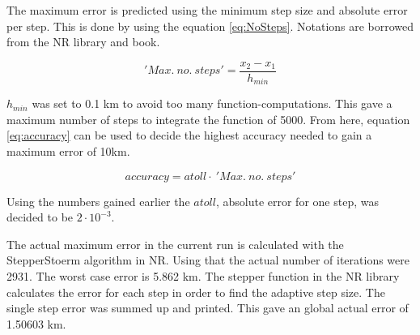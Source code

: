 The maximum error is predicted using the minimum step size and absolute error per step.
This is done by using the equation \ref{eq:NoSteps}.
Notations are borrowed from the NR library and book.

\begin{equation}
'Max.\ no.\ steps' = \frac{x_2 - x_1}{h_{min}}
\label{eq:NoSteps}
\end{equation}

\(h_{min}\) was set to 0.1 km to avoid too many function-computations.
This gave a maximum number of steps to integrate the function of 5000.
From here, equation \ref{eq:accuracy} can be used to decide the highest accuracy needed to gain a maximum error of 10km.

\begin{equation}
accuracy = atoll \cdot \ 'Max.\ no.\ steps'
\label{eq:accuracy}
\end{equation}

Using the numbers gained earlier the \(atoll\), absolute error for one step, was decided to be \(2\cdot10^{-3}\).

The actual maximum error in the current run is calculated with the StepperStoerm algorithm in NR.
Using that the actual number of iterations were 2931. The worst case error is 5.862 km.
The stepper function in the NR library calculates the error for each step in order to find the adaptive step size. 
The single step error was summed up and printed.
This gave an global actual error of 1.50603 km. 

